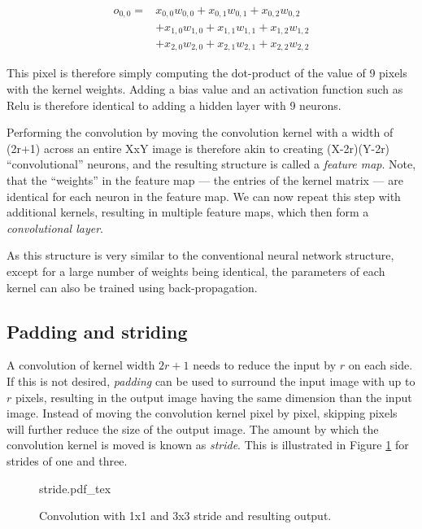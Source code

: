 \begin{eqnarray}
o_{0,0}=&x_{0,0}w_{0,0}+x_{0,1}w_{0,1}+x_{0,2}w_{0,2}\\
\nonumber
		&+x_{1,0}w_{1,0}+x_{1,1}w_{1,1}+x_{1,2}w_{1,2}\\
\nonumber
		&+x_{2,0}w_{2,0}+x_{2,1}w_{2,1}+x_{2,2}w_{2,2}
\end{eqnarray}

This pixel is therefore simply computing the dot-product of the value of 9 pixels with the kernel weights. Adding a bias value and an activation function such as Relu is therefore identical to adding a hidden layer with 9 neurons. 

Performing the convolution by moving the convolution kernel with a width of (2r+1) across an entire XxY image is therefore akin to creating (X-2r)(Y-2r) ``convolutional'' neurons, and the resulting structure is called a \emph{feature map}. Note, that the ``weights'' in the feature map --- the entries of the kernel matrix --- are identical for each neuron in the feature map. We can now repeat this step with additional kernels, resulting in multiple feature maps, which then form a \emph{convolutional layer}.

As this structure is very similar to the conventional neural network structure, except for a large number of weights being identical, the parameters of each kernel can also be trained using back-propagation. 

\subsection{Padding and striding}

A convolution of kernel width $2r+1$ needs to reduce the input by $r$ on each side. If this is not desired, \emph{padding} can be used to surround the input image with up to $r$ pixels, resulting in the output image having the same dimension than the input image. Instead of moving the convolution kernel pixel by pixel, skipping pixels will further reduce the size of the output image. The amount by which the convolution kernel is moved is known as \emph{stride}. This is illustrated in Figure \ref{fig:stride} for strides of one and three.

\begin{figure}[htb]
    \centering
    \def\svgwidth{0.8\textwidth}
    {stride.pdf_tex}
    \caption{Convolution with 1x1 and 3x3 stride and resulting output.\label{fig:stride}}
\end{figure}

